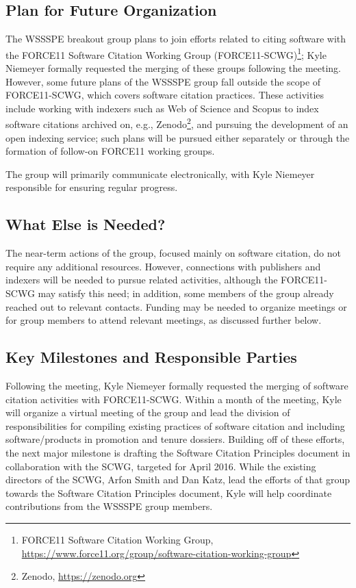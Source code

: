 \subsection{Plan for Future Organization}

The WSSSPE breakout group plans to join efforts related to citing software with the FORCE11 Software Citation Working Group (FORCE11-SCWG)\footnote{FORCE11 Software Citation Working Group, \url{https://www.force11.org/group/software-citation-working-group}}; Kyle Niemeyer formally requested the merging of these groups following the meeting.
However, some future plans of the WSSSPE group fall outside the scope of FORCE11-SCWG, which covers software citation practices.
These activities include working with indexers such as Web of Science and Scopus to index software citations archived on, e.g., Zenodo\footnote{Zenodo, \url{https://zenodo.org}}, and pursuing the development of an open indexing service; such plans will be pursued either separately or through the formation of follow-on FORCE11 working groups.

The group will primarily communicate electronically, with Kyle Niemeyer responsible for ensuring regular progress.

\subsection{What Else is Needed?}

The near-term actions of the group, focused mainly on software citation, do not require any additional resources.
However, connections with publishers and indexers will be needed to pursue related activities, although the FORCE11-SCWG may satisfy this need; in addition, some members of the group already reached out to relevant contacts.
Funding may be needed to organize meetings or for group members to attend relevant meetings, as discussed further below.

\subsection{Key Milestones and Responsible Parties}

Following the meeting, Kyle Niemeyer formally requested the merging of software citation activities with FORCE11-SCWG.
Within a month of the meeting, Kyle will organize a virtual meeting of the group and lead the division of responsibilities for compiling existing practices of software citation and including software\slash products in promotion and tenure dossiers.
Building off of these efforts, the next major milestone is drafting the Software Citation Principles document in collaboration with the SCWG, targeted for April 2016.
While the existing directors of the SCWG, Arfon Smith and Dan Katz, lead the efforts of that group towards the Software Citation Principles document, Kyle will help coordinate contributions from the WSSSPE group members.


